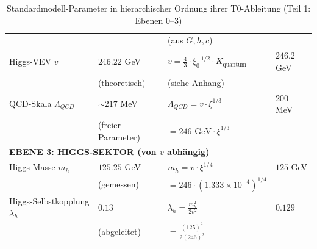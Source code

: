 \documentclass[12pt,a4paper]{article}
\begin{document}
\begin{table}[htbp]
{\begin{tabular}{p{5cm}p{3cm}p{2.7cm}p{2.7cm}}
			& & (aus $G, \hbar, c$) & \\[0.3em]
			Higgs-VEV $v$ & $246.22$ GeV & $v = \frac{4}{3} \cdot \xi_0^{-1/2} \cdot K_{\text{quantum}}$ & $246.2$ GeV \\
			& (theoretisch) & (siehe Anhang) & \\[0.3em]
			QCD-Skala $\Lambda_{QCD}$ & $\sim 217$ MeV & $\Lambda_{QCD} = v \cdot \xi^{1/3}$ & $200$ MeV \\
			& (freier Parameter) & $= 246 \text{ GeV} \cdot \xi^{1/3}$ & \\[0.3em]
			\midrule
			\multicolumn{4}{l}{\textbf{EBENE 3: HIGGS-SEKTOR (von $v$ abhängig)}} \\
			\midrule
			Higgs-Masse $m_h$ & $125.25$ GeV & $m_h = v \cdot \xi^{1/4}$ & $125$ GeV \\
			& (gemessen) & $= 246 \cdot (1.333 \times 10^{-4})^{1/4}$ & \\[0.3em]
			Higgs-Selbstkopplung $\lambda_h$ & $0.13$ & $\lambda_h = \frac{m_h^2}{2v^2}$ & $0.129$ \\
			& (abgeleitet) & $= \frac{(125)^2}{2(246)^2}$ & \\[0.3em]
			\bottomrule
		\end{tabular}%
	}
	\caption{Standardmodell-Parameter in hierarchischer Ordnung ihrer T0-Ableitung (Teil 1: Ebenen 0--3)}
	\label{tab:sm-params-1}
\end{table}
\end{document}
